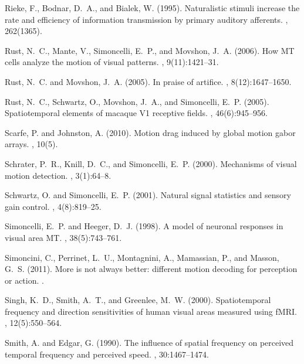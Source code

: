 \documentclass[a4paper,11pt]{article}%
\begin{document}
\begin{thebibliography}{}
Rieke, F., Bodnar, D.~A., and Bialek, W. (1995).
\newblock Naturalistic stimuli increase the rate and efficiency of information
  transmission by primary auditory afferents.
, 262(1365).

Rust, N.~C., Mante, V., Simoncelli, E.~P., and Movshon, J.~A. (2006).
\newblock How {MT} cells analyze the motion of visual patterns.
, 9(11):1421--31.

Rust, N.~C. and Movshon, J.~A. (2005).
\newblock In praise of artifice.
, 8(12):1647--1650.

Rust, N.~C., Schwartz, O., Movshon, J.~A., and Simoncelli, E.~P. (2005).
\newblock Spatiotemporal elements of macaque {V1} receptive fields.
, 46(6):945--956.

Scarfe, P. and Johnston, A. (2010).
\newblock Motion drag induced by global motion gabor arrays.
, 10(5).

Schrater, P.~R., Knill, D.~C., and Simoncelli, E.~P. (2000).
\newblock Mechanisms of visual motion detection.
, 3(1):64--8.

Schwartz, O. and Simoncelli, E.~P. (2001).
\newblock Natural signal statistics and sensory gain control.
, 4(8):819--25.

Simoncelli, E.~P. and Heeger, D.~J. (1998).
\newblock A model of neuronal responses in visual area {MT}.
, 38(5):743--761.

Simoncini, C., Perrinet, L.~U., Montagnini, A., Mamassian, P., and Masson,
  G.~S. (2011).
\newblock More is not always better: different motion decoding for perception
  or action.
.

Singh, K.~D., Smith, A.~T., and Greenlee, M.~W. (2000).
\newblock Spatiotemporal frequency and direction sensitivities of human visual
  areas measured using {fMRI}.
, 12(5):550--564.

Smith, A. and Edgar, G. (1990).
\newblock The influence of spatial frequency on perceived temporal frequency
  and perceived speed.
, 30:1467--1474.


\end{thebibliography}
\end{document}
